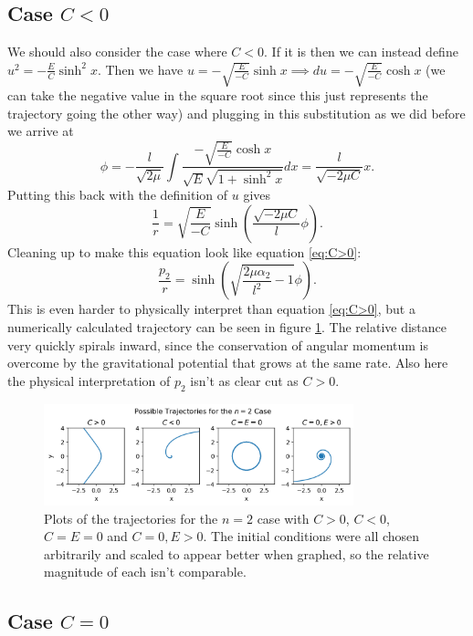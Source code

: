 \documentclass[letterpaper, reqno,11pt]{article}
\begin{document}
\subsection{Case $C<0$}

We should also consider the case where $C<0$. If it is then we can instead define $u^2=-\frac{E}{C}\sinh^2x$. Then we have $u=-\sqrt{\frac{E}{-C}}\sinh x \implies du=-\sqrt{\frac{E}{-C}} \cosh x$ (we can take the negative value in the square root since this just represents the trajectory going the other way) and plugging in this substitution as we did before we arrive at 
\[
\phi = -\frac{l}{\sqrt{2\mu} }\int \frac{-\sqrt{\frac{E}{-C}} \cosh x}{\sqrt{E} \sqrt{1+\sinh^2 x}}dx=\frac{l}{\sqrt{-2\mu C}}x
.\]
Putting this back with the definition of $u$ gives 
\[
\frac{1}{r}=\sqrt{\frac{E}{-C}} \sinh\left( \frac{\sqrt{-2\mu C}}{l}\phi \right) 
.\]
Cleaning up to make this equation look like equation \ref{eq:C>0}: 
\begin{equation}\label{C<0}
\frac{p_2}{r}=\sinh\left( \sqrt{\frac{2\mu\alpha_2}{l^2}-1} \phi \right) 
.\end{equation}
This is even harder to physically interpret than equation \ref{eq:C>0}, but a numerically calculated trajectory can be seen in figure \ref{fig:trajectories}. The relative distance very quickly spirals inward, since the conservation of angular momentum is overcome by the gravitational potential that grows at the same rate. Also here the physical interpretation of $p_2$ isn't as clear cut as $C>0$.  

\begin{figure}[htpb]
    \centering
    \includegraphics[width=0.8\textwidth]{trajectories}
    \caption{Plots of the trajectories for the $n=2$ case with $C>0$, $C<0$, $C=E=0$ and $C=0,E>0$. The initial conditions were all chosen arbitrarily and scaled to appear better when graphed, so the relative magnitude of each isn't comparable. }
    \label{fig:trajectories}
\end{figure}

\subsection{Case $C=0$}
\end{document}
